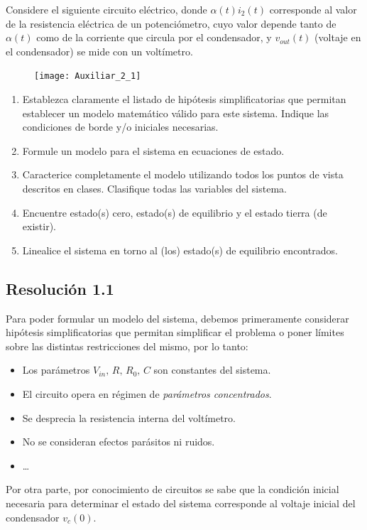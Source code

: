\documentclass[
  11pt,
  letterpaper,
   addpoints,
   answers
  ]{exam}
\begin{document}
\begin{questions}
    \question Considere el siguiente circuito eléctrico, donde \(\alpha(t)i_2(t)\) corresponde al valor de la resistencia eléctrica de un potenciómetro, cuyo valor depende tanto de \(\alpha(t)\) como de la corriente que circula por el condensador, y \(v_{out}(t)\) (voltaje en el condensador) se mide con un voltímetro.
\begin{figure}[ht]
        \centering
        \texttt{[image: Auxiliar\_2\_1]}
    \end{figure}
\begin{enumerate}
    \item Establezca claramente el listado de hipótesis simplificatorias que permitan
    establecer un modelo matemático válido para este sistema. Indique las condiciones de borde y/o
    iniciales necesarias.
    \item Formule un modelo para el sistema en ecuaciones de estado.
    \item Caracterice completamente el modelo utilizando todos los puntos de vista descritos en clases.
    Clasifique todas las variables del sistema.
    \item Encuentre estado(s) cero, estado(s) de equilibrio y el estado tierra (de existir).
    \item Linealice el sistema en torno al (los) estado(s) de equilibrio encontrados.
\end{enumerate}
\begin{solution}
\subsection*{Resolución 1.1}
Para poder formular un modelo del sistema, debemos primeramente considerar hipótesis simplificatorias que permitan simplificar el problema o poner límites sobre las distintas restricciones del mismo, por lo tanto:
\begin{itemize}
    \item Los parámetros \(V_{in},\,R,\,R_0,\,C\) son constantes del sistema.
    \item El circuito opera en régimen de \emph{parámetros concentrados}.
    \item Se desprecia la resistencia interna del voltímetro.
    \item No se consideran efectos parásitos ni ruidos.
    \item \dots
\end{itemize}
Por otra parte, por conocimiento de circuitos se sabe que la condición inicial necesaria para determinar el estado del sistema corresponde al voltaje inicial del condensador \(v_c(0)\).

\end{solution}
\end{questions}
\end{document}
